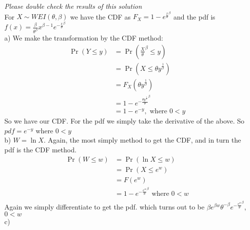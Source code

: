 \par{} \textit{Please double check the results of this solution} \\
For $X \sim WEI(\theta, \beta)$ we have the CDF as $F_X = 1 - e^{\frac{x}{\theta}^{\beta}}$ and the pdf is $f(x) = \frac{\beta}{\theta^{\beta}} x^{\beta - 1} e^{- \frac{x}{\theta}^{\beta}}$ \\
a) We make the transformation by the CDF method: \\
\begin{align*}
	\Pr \left( Y \leq y \right) & = \Pr \left( \frac{X}{\theta}^{\beta} \leq y \right) \\
	& = \Pr \left( X \leq \theta y^{\frac{1}{\beta}} \right) \\
	& = F_{X} \left( \theta y^{ \frac{1}{\beta}} \right) \\
	& = 1 - e^{ - \frac{\theta y^{ \frac{1}{\beta}}}{\theta}^{\beta}} \\
	& = 1 - e^{-y} , \text{ where } 0 < y 
\end{align*}
So we have our CDF. For the pdf we simply take the derivative of the above. So $pdf = e^{-y}$ where $0 < y$ \\

b) $W = \ln X$. Again, the most simply method to get the CDF, and in turn the pdf is the CDF method. \\
\begin{align}
	\Pr \left( W \leq w \right) & = \Pr \left( \ln X \leq w \right) \\
	& = \Pr \left( X \leq e^{w} \right) \\
	& = F \left( e^{w} \right) \\
	& = 1 - e^{ - \frac{e^{w}}{\theta}^{\beta}} \text{ where } 0 < w \\
\end{align} 
Again we simply differentiate to get the pdf. which turns out to be $\beta e^{\beta w} \theta^{- \beta} e^{ - \frac{e^{w}}{\theta}^{\beta}}$, $0 < w$\\
c) 
	
